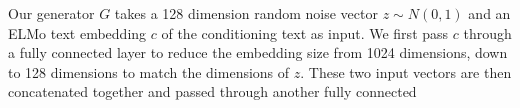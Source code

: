 Our generator $G$ takes a 128 dimension random noise vector $z \sim N(0, 1)$ and an ELMo text embedding $c$ of the conditioning text as input. We first pass $c$ through a fully connected layer to reduce the embedding size from 1024 dimensions, down to 128 dimensions to match the dimensions of $z$. These two input vectors are then concatenated together and passed through another fully connected 